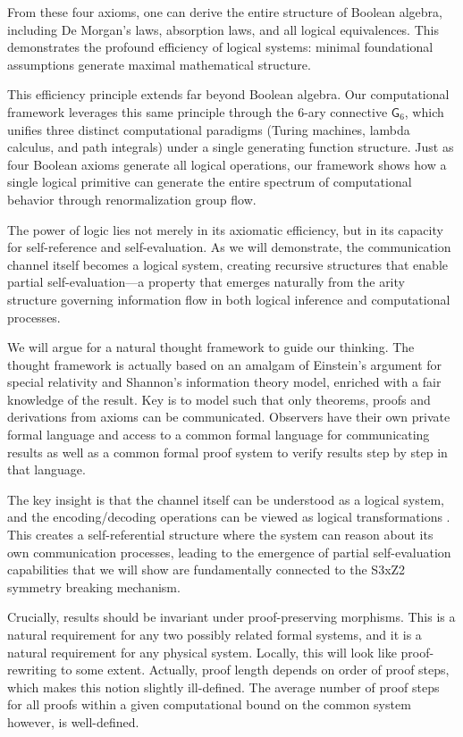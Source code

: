 From these four axioms, one can derive the entire structure of Boolean algebra, including De Morgan's laws, absorption laws, and all logical equivalences. This demonstrates the profound efficiency of logical systems: minimal foundational assumptions generate maximal mathematical structure.

This efficiency principle extends far beyond Boolean algebra. Our computational framework leverages this same principle through the 6-ary connective $\mathsf{G}_6$, which unifies three distinct computational paradigms (Turing machines, lambda calculus, and path integrals) under a single generating function structure. Just as four Boolean axioms generate all logical operations, our framework shows how a single logical primitive can generate the entire spectrum of computational behavior through renormalization group flow.

The power of logic lies not merely in its axiomatic efficiency, but in its capacity for self-reference and self-evaluation. As we will demonstrate, the communication channel itself becomes a logical system, creating recursive structures that enable partial self-evaluation—a property that emerges naturally from the arity structure governing information flow in both logical inference and computational processes.  


We will argue for a natural thought framework to guide our thinking. The thought framework is actually based on an amalgam of Einstein's argument for special relativity and Shannon's information theory model, enriched with a fair knowledge of the result. Key is to model such that only theorems, proofs and derivations from axioms can be communicated. Observers have their own private formal language and access to a common formal language for communicating results as well as a common formal proof system to verify results step by step in that language.

The key insight is that the channel itself can be understood as a logical system, and the encoding/decoding operations can be viewed as logical transformations \cite{shannon1948}. This creates a self-referential structure where the system can reason about its own communication processes, leading to the emergence of partial self-evaluation capabilities that we will show are fundamentally connected to the S3xZ2 symmetry breaking mechanism.

Crucially, results should be invariant under proof-preserving morphisms. This is a natural requirement for any two possibly related formal systems, and it is a natural requirement for any physical system. Locally, this will look like proof-rewriting to some extent. Actually, proof length depends on order of proof steps, which makes this notion slightly ill-defined. The average number of proof steps for all proofs within a given computational bound on the common system however, is well-defined.

